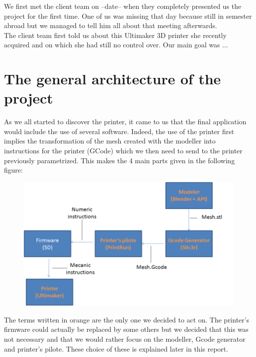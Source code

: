 \documentclass{report}
\begin{document}
We first met the client team on --date-- when they completely presented us the project for the first time. One of us was missing that day because still in semester abroad but we managed to tell him all about that meeting afterwards. \\

The client team first told us about this Ultimaker 3D printer she recently acquired and on which she had still no control over. Our main goal was ...

\section{The general architecture of the project}

As we all started to discover the printer, it came to us that the final application would include the use of several software. Indeed, the use of the printer first implies the transformation of the mesh created with the modeller into instructions for the printer (GCode) which we then need to send to the printer previously parametrized. This makes the 4 main parts given in the following figure:

\begin{figure}[!h]
\begin{center}
	\includegraphics[scale=0.2]{ARD1}
\end{center}
\end{figure}

The terms written in orange are the only one we decided to act on. The printer's firmware could actually be replaced by some others but we decided that this was not necessary and that we would rather focus on the modeller, Gcode generator and printer's pilote. These choice of these is explained later in this report. 
\end{document}
